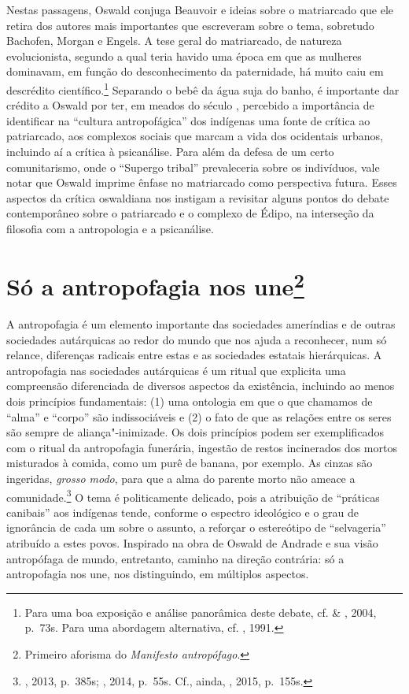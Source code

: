 Nestas passagens, Oswald conjuga Beauvoir e ideias sobre o matriarcado
que ele retira dos autores mais importantes que escreveram sobre o tema,
sobretudo Bachofen, Morgan e Engels. A tese geral do matriarcado, de
natureza evolucionista, segundo a qual teria havido uma época em que as
mulheres dominavam, em função do desconhecimento da paternidade, há
muito caiu em descrédito científico.\footnote{Para uma boa exposição e
  análise panorâmica deste debate, cf.  \& , 2004, p.~73s. Para
  uma abordagem alternativa, cf. , 1991.} Separando o bebê da água
suja do banho, é importante dar crédito a Oswald por ter, em meados do
século , percebido a importância de identificar na ``cultura
antropofágica'' dos indígenas uma fonte de crítica ao patriarcado, aos
complexos sociais que marcam a vida dos ocidentais urbanos, incluindo aí
a crítica à psicanálise. Para além da defesa de um certo comunitarismo,
onde o ``Supergo tribal'' prevaleceria sobre os indivíduos, vale notar
que Oswald imprime ênfase no matriarcado como perspectiva futura. Esses
aspectos da crítica oswaldiana nos instigam a revisitar alguns pontos do
debate contemporâneo sobre o patriarcado e o complexo de Édipo, na
interseção da filosofia com a antropologia e a psicanálise.

\section{Só a antropofagia nos une\protect\footnote{\uppercase{P}rimeiro aforisma do
  \emph{\uppercase{M}anifesto antropófago}.}}

A antropofagia é um elemento importante das sociedades ameríndias e de
outras sociedades autárquicas ao redor do mundo que nos ajuda a
reconhecer, num só relance, diferenças radicais entre estas e as
sociedades estatais hierárquicas. A antropofagia nas sociedades
autárquicas é um ritual que explicita uma compreensão diferenciada de
diversos aspectos da existência, incluindo ao menos dois princípios
fundamentais: (1) uma ontologia em que o que chamamos de ``alma'' e
``corpo'' são indissociáveis e (2) o fato de que as relações entre os
seres são sempre de aliança"-inimizade. Os dois princípios podem ser
exemplificados com o ritual da antropofagia funerária, ingestão de
restos incinerados dos mortos misturados à comida, como um purê de
banana, por exemplo. As cinzas são ingeridas, \emph{grosso modo}, para
que a alma do parente morto não ameace a comunidade.\footnote{,
  2013, p.~385s; , 2014, p.~55s. Cf., ainda, ,
  2015, p.~155s.} O tema é politicamente delicado, pois a atribuição de
``práticas canibais'' aos indígenas tende, conforme o espectro
ideológico e o grau de ignorância de cada um sobre o assunto, a reforçar
o estereótipo de ``selvageria'' atribuído a estes povos. Inspirado na
obra de Oswald de Andrade e sua visão antropófaga de mundo, entretanto,
caminho na direção contrária: só a antropofagia nos une, nos
distinguindo, em múltiplos aspectos.

